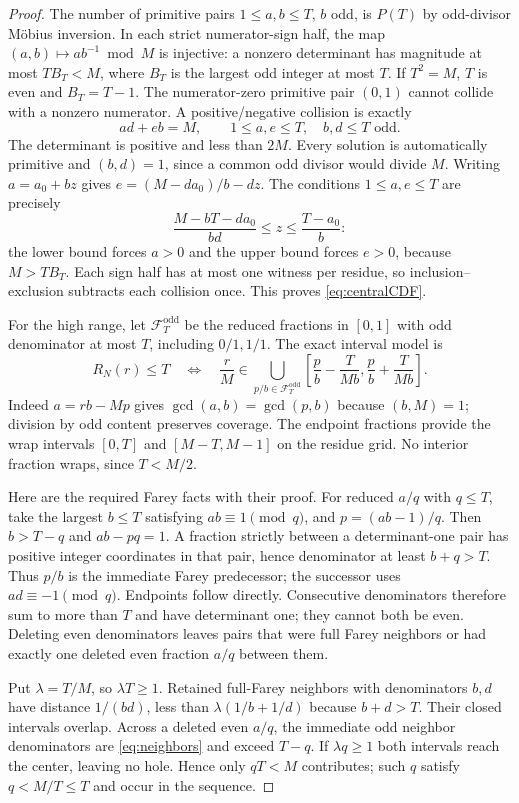\documentclass[11pt,a4paper]{article}
\numberwithin{equation}{section}
\theoremstyle{remark}
\newcommand{\odd}{\mathrm{odd}}
\begin{document}
\begin{proof}
The number of primitive pairs $1\le a,b\le T$, $b$ odd, is $P(T)$
by odd-divisor M\"obius inversion. In each strict numerator-sign half,
the map $(a,b)\mapsto ab^{-1}\bmod M$ is injective: a nonzero
determinant has magnitude at most $TB_T<M$, where $B_T$ is the largest
odd integer at most $T$. If $T^2=M$, $T$ is even and $B_T=T-1$.
The numerator-zero primitive pair $(0,1)$ cannot collide with a
nonzero numerator. A positive/negative collision is exactly
\[
ad+eb=M,\qquad 1\le a,e\le T,\quad b,d\le T\text{ odd}.
\]
The determinant is positive and less than $2M$. Every solution is
automatically primitive and $(b,d)=1$, since a common odd divisor
would divide $M$. Writing $a=a_0+bz$ gives
$e=(M-da_0)/b-dz$. The conditions $1\le a,e\le T$ are precisely
\[
\frac{M-bT-da_0}{bd}\le z\le\frac{T-a_0}b:
\]
the lower bound forces $a>0$ and the upper bound forces $e>0$,
because $M>TB_T$. Each sign half has at most one witness per residue,
so inclusion--exclusion subtracts each collision once. This proves
\eqref{eq:centralCDF}.

For the high range, let $\mathcal F_T^{\odd}$ be the reduced fractions
in $[0,1]$ with odd denominator at most $T$, including $0/1,1/1$.
The exact interval model is
\begin{equation}\label{eq:interval}
R_N(r)\le T\quad\Longleftrightarrow\quad
\frac rM\in\bigcup_{p/b\in\mathcal F_T^{\odd}}
\left[\frac pb-\frac{T}{Mb},\frac pb+\frac{T}{Mb}\right].
\end{equation}
Indeed $a=rb-Mp$ gives $\gcd(a,b)=\gcd(p,b)$ because $(b,M)=1$;
division by odd content preserves coverage. The endpoint fractions
provide the wrap intervals $[0,T]$ and $[M-T,M-1]$ on the residue grid.
No interior fraction wraps, since $T<M/2$.

Here are the required Farey facts with their proof. For reduced
$a/q$ with $q\le T$, take the largest $b\le T$ satisfying
$ab\equiv1\pmod q$, and $p=(ab-1)/q$. Then $b>T-q$ and
$ab-pq=1$. A fraction strictly between a determinant-one pair has
positive integer coordinates in that pair, hence denominator at least
$b+q>T$. Thus $p/b$ is the immediate Farey predecessor; the successor
uses $ad\equiv-1\pmod q$. Endpoints follow directly. Consecutive
denominators therefore sum to more than $T$ and have determinant one;
they cannot both be even. Deleting even denominators leaves pairs
that were full Farey neighbors or had exactly one deleted even
fraction $a/q$ between them.

Put $\lambda=T/M$, so $\lambda T\ge1$. Retained full-Farey neighbors
with denominators $b,d$ have distance $1/(bd)$, less than
$\lambda(1/b+1/d)$ because $b+d>T$. Their closed intervals overlap.
Across a deleted even $a/q$, the immediate odd neighbor denominators
are \eqref{eq:neighbors} and exceed $T-q$. If $\lambda q\ge1$ both
intervals reach the center, leaving no hole. Hence only $qT<M$
contributes; such $q$ satisfy $q<M/T\le T$ and occur in the sequence.


\end{proof}
\end{document}
